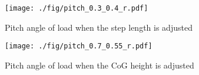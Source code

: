 \begin{figure}[tb]
    \begin{center}
    \texttt{[image: ./fig/pitch\_0.3\_0.4\_r.pdf]}
    \caption{Pitch angle of load when the step length is adjusted}
\end{center}
\end{figure}
\begin{figure}[tb]
    \begin{center}
    \texttt{[image: ./fig/pitch\_0.7\_0.55\_r.pdf]}
    \caption{Pitch angle of load when the CoG height is adjusted}
\end{center}
\end{figure}
